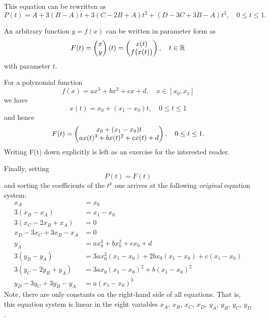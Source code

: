 \documentclass{article}
\begin{document}
This equation can be rewritten as
\begin{equation}
P(t)  = A + 3(B-A)t + 3(C-2B+A)t^2 + (D-3C+3B-A)t^3,\quad 0\leq t\leq 1.
\end{equation}

An arbitrary function $y=f(x)$ can be written in parameter form as
\begin{equation}
  F(t) = \left(
    \begin{array}{@{}c@{}}
      x \\
      y \\
    \end{array}
  \right)(t) = \left(
    \begin{array}{@{}c@{}}
      x(t) \\
      f\big(x(t)\big) \\
    \end{array}
  \right),\quad t\in \mathbb{R}
\end{equation}
with parameter $t$.

For a polynomial function
\begin{equation}
  f(x) = ax^3 + bx^2 + cx + d,\quad x\in [x_0, x_1]
\end{equation}
we have
\begin{equation}
  x(t) = x_0 + (x_1-x_0)t,\quad 0\leq t\leq 1
\end{equation}
and hence
\begin{equation}
  F(t) = \left(
    \begin{array}{@{}c@{}}
      x_0 + (x_1-x_0)t \\
      ax(t)^3 + bx(t)^2 + cx(t) + d \\
    \end{array}
  \right),\quad 0\leq t\leq 1.
\end{equation}
Writing F(t) down explicitly is left as an exercise for the interested reader.

Finally, setting
\begin{equation}
  P(t) = F(t)
\end{equation}
and sorting the coefficients of the $t^k$ one arrives at the following \emph{original} equation system:
\begin{align}
  x_A & = x_0 \label{eq:xA} \\
  3(x_B-x_A) & = x_1 - x_0 \label{eq:xB} \\
  3(x_C-2x_B+x_A) & = 0 \label{eq:xC} \\
  x_D-3x_C+3x_B-x_A & = 0 \label{eq:xD} \\
  y_A & = ax_0^3 + bx_0^2 + cx_0 + d \label{eq:yA} \\
  3(y_B-y_A) & = 3ax_0^2(x_1-x_0) + 2bx_0(x_1-x_0) + c(x_1-x_0) \label{eq:yB} \\
  3(y_C-2y_B+y_A) & = 3ax_0(x_1-x_0)^2 + b(x_1-x_0)^2 \label{eq:yC} \\
  y_D-3y_C+3y_B-y_A & = a(x_1-x_0)^3 \label{eq:yD}
\end{align}
Note, there are only constants on the right-hand side of all equations.  That is, this equation system is linear in the eight variables $x_A$, $x_B$, $x_C$, $x_D$, $y_A$, $y_B$, $y_C$, $y_D$.
\end{document}

